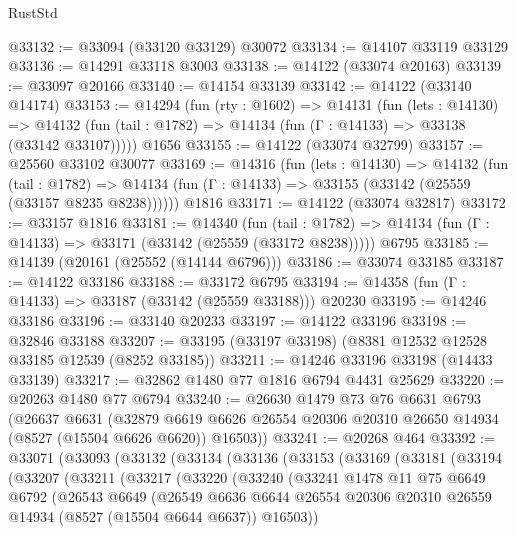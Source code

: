 \begin{lexlean}{RustStd}
\begin{coremodule}
@33132 := @33094 (@33120 @33129) @30072
@33134 := @14107 @33119 @33129
@33136 := @14291 @33118 @3003
@33138 := @14122 (@33074 @20163)
@33139 := @33097 @20166
@33140 := @14154 @33139
@33142 := @14122 (@33140 @14174)
@33153 := @14294
    (fun (rty : @1602) =>
    @14131
      (fun (lets : @14130) =>
      @14132 (fun (tail : @1782) => @14134 (fun (Γ : @14133) => @33138 (@33142 @33107)))))
    @1656
@33155 := @14122 (@33074 @32799)
@33157 := @25560 @33102 @30077
@33169 := @14316
    (fun (lets : @14130) =>
    @14132
      (fun (tail : @1782) =>
      @14134 (fun (Γ : @14133) => @33155 (@33142 (@25559 (@33157 @8235 @8238))))))
    @1816
@33171 := @14122 (@33074 @32817)
@33172 := @33157 @1816
@33181 := @14340
    (fun (tail : @1782) => @14134 (fun (Γ : @14133) => @33171 (@33142 (@25559 (@33172 @8238)))))
    @6795
@33185 := @14139 (@20161 (@25552 (@14144 @6796)))
@33186 := @33074 @33185
@33187 := @14122 @33186
@33188 := @33172 @6795
@33194 := @14358 (fun (Γ : @14133) => @33187 (@33142 (@25559 @33188))) @20230
@33195 := @14246 @33186
@33196 := @33140 @20233
@33197 := @14122 @33196
@33198 := @32846 @33188
@33207 := @33195 (@33197 @33198) (@8381 @12532 @12528 @33185 @12539 (@8252 @33185))
@33211 := @14246 @33196 @33198 (@14433 @33139)
@33217 := @32862 @1480 @77 @1816 @6794 @4431 @25629
@33220 := @20263 @1480 @77 @6794
@33240 := @26630
    @1479
    @73
    @76
    @6631
    @6793
    (@26637
      @6631
      (@32879 @6619 @6626 @26554 @20306 @20310 @26650 @14934 (@8527 (@15504 @6626 @6620)) @16503))
@33241 := @20268 @464
@33392 := @33071
    (@33093
      (@33132
        (@33134
          (@33136
            (@33153
              (@33169
                (@33181
                  (@33194
                    (@33207
                      (@33211
                        (@33217
                          (@33220
                            (@33240
                              (@33241
                                @1478
                                @11
                                @75
                                @6649
                                @6792
                                (@26543
                                  @6649
                                  (@26549
                                    @6636
                                    @6644
                                    @26554
                                    @20306
                                    @20310
                                    @26559
                                    @14934
                                    (@8527 (@15504 @6644 @6637))
                                    @16503))

\end{coremodule}
\end{lexlean}
